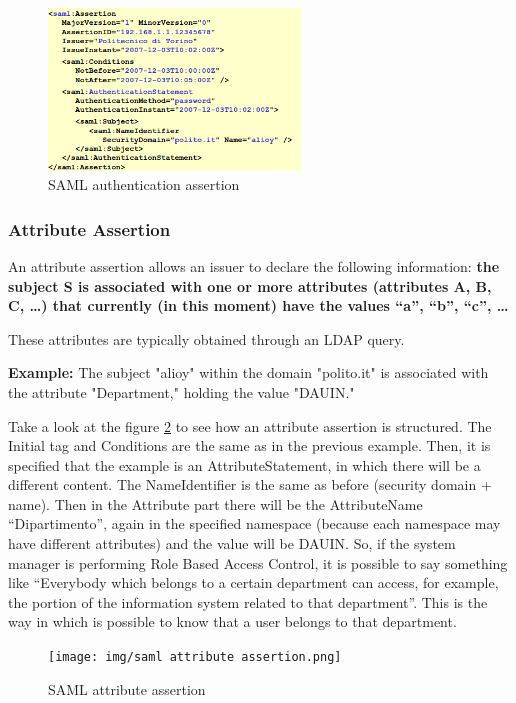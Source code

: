 \begin{figure}[H]
  \centering
  \includegraphics[width=0.6\textwidth]{img/saml auth assertion.png}
  \caption{SAML authentication assertion}
  \label{fig:saml-auth-assertion}
\end{figure}

\subsubsection{Attribute Assertion}

An attribute assertion allows an issuer to declare the following
information: \textbf{the subject S is associated with one or more
  attributes (attributes A, B, C, …) that currently (in this moment)
  have the values “a”, “b”, “c”, … }

\noindent These attributes are typically obtained through an LDAP
query.

\noindent \textbf{Example:} The subject "alioy" within the domain
"polito.it" is associated with the attribute "Department," holding the
value "DAUIN."

Take a look at the figure \ref{fig:saml-attribute-assertion} to see
how an attribute assertion is structured. 
The Initial tag and Conditions are the same as in the previous
example. Then, it is specified that the example is an
AttributeStatement, in which there will be a different content. The
NameIdentifier is the same as before (security domain + name). Then in
the Attribute part there will be the AttributeName “Dipartimento”,
again in the specified namespace (because each namespace may have
different attributes) and the value will be DAUIN. So, if the system
manager is performing Role Based Access Control, it is possible to say
something like “Everybody which belongs to a certain department can
access, for example, the portion of the information system related to
that department”. This is the way in which is possible to know that a
user belongs to that department.

\begin{figure}[H]
  \centering
  \texttt{[image: img/saml attribute
  assertion.png]}
  \label{fig:saml-attribute-assertion}
  \caption{SAML attribute assertion}
\end{figure}

